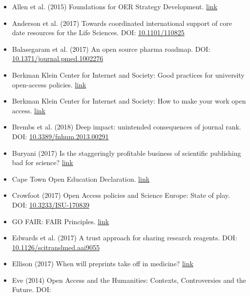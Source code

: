 \begin{itemize}
\item
  Allen et al. (2015) Foundations for OER Strategy Development.
  \href{http://www.oerstrategy.org/home/read-the-doc/}{link}
\item
  Anderson et al. (2017) Towards coordinated international support of
  core date resources for the Life Sciences. DOI:
  \href{https://doi.org/10.1101/110825}{10.1101/110825}
\item
  Balasegaram et al. (2017) An open source pharma roadmap. DOI:
  \href{https://doi.org/10.1371/journal.pmed.1002276}{10.1371/journal.pmed.1002276}
\item
  Berkman Klein Center for Internet and Society: Good practices for
  university open-access policies.
  \href{https://cyber.harvard.edu/hoap/Good_practices_for_university_open-access_policies}{link}
\item
  Berkman Klein Center for Internet and Society: How to make your work
  open access.
  \href{https://cyber.harvard.edu/hoap/How_to_make_your_own_work_open_access}{link}
\item
  Brembs et al. (2018) Deep impact: unintended consequences of journal
  rank. DOI:
  \href{https://dx.doi.org/10.3389/fnhum.2013.00291}{10.3389/fnhum.2013.00291}
\item
  Buryani (2017) Is the staggeringly profitable business of scientific
  publishing bad for science?
  \href{https://www.theguardian.com/science/2017/jun/27/profitable-business-scientific-publishing-bad-for-science}{link}
\item
  Cape Town Open Education Declaration.
  \href{https://www.capetowndeclaration.org/sign-the-declaration}{link}
\item
  Crowfoot (2017) Open Access policies and Science Europe: State of
  play. DOI:
  \href{https://doi.org/10.3233/ISU-170839}{10.3233/ISU-170839}
\item
  GO FAIR: FAIR Principles.
  \href{https://www.go-fair.org/fair-principles/}{link}
\item
  Edwards et al. (2017) A trust approach for sharing research reagents.
  DOI:
  \href{https://doi.org/10.1126/scitranslmed.aai9055}{10.1126/scitranslmed.aai9055}
\item
  Ellison (2017) When will preprints take off in medicine?
  \href{https://openpharma.blog/2017/08/14/when-will-preprints-take-off-in-medicine/}{link}
\item
  Eve (2014) Open Access and the Humanities: Contexts, Controversies and
  the Future. DOI:

\end{itemize}
